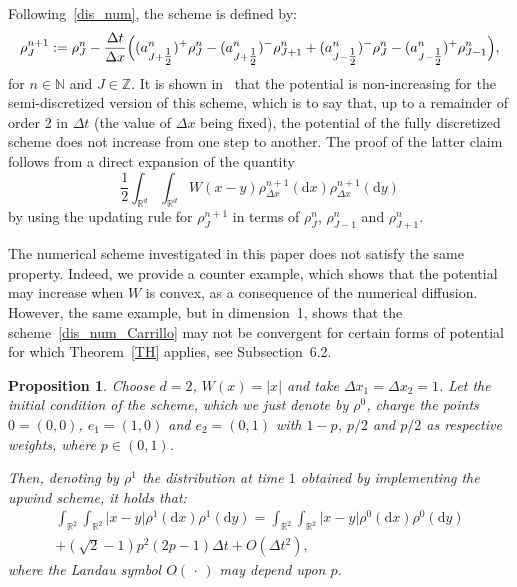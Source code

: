 \documentclass[11pt]{article}
\newtheorem{prop}[theo]{Proposition}
\theoremstyle{definition}
\numberwithin{equation}{section}
\newcommand*{\dd}{\mathrm{d}}
\newcommand*{\dx}{\dd x}
\newcommand*{\dy}{\dd y}
\newcommand*\NN{\mathbb{N}}
\newcommand*\RR{\mathbb{R}}
\newcommand*\ZZ{\mathbb{Z}}
\begin{document}
Following~\eqref{dis_num}, the scheme is defined by:
\begin{equation}\label{dis_num_Carrillo}
\rho^{n+1}_{J} := \rho^n_{J} - \frac{\Delta t}{\Delta x}
\Bigl((a^n_{J+\tfrac12} )^{+} \rho_{J}^n -
(a^n_{J+\tfrac12} )^{-} \rho_{J+1}^n +
(a^n_{J-\tfrac12} )^{-} \rho_{J}^n -
(a^n_{J-\tfrac12} )^{+} \rho_{J-1}^n
\Bigr),
\end{equation}
for $n \in \NN$ and $J \in \ZZ$. It is shown in~\cite{CCH} that the potential is non-increasing for the semi-discretized version of this scheme, which is to say that, up to a remainder of order 2 in $\Delta t$ (the value of $\Delta x$ being fixed), the potential of the fully discretized scheme does not increase from one step to another. The proof of the latter claim follows from a direct expansion of the quantity
\begin{equation*}
\frac12
\int_{\RR^d}
\int_{\RR^d} W(x-y)
\rho_{\Delta x}^{n+1}(\dx)
\rho_{\Delta x}^{n+1}(\dy)
\end{equation*}
by using the updating rule for $\rho^{n+1}_{J}$ in terms of $\rho^{n}_{J}$, $\rho^{n}_{J-1}$ and $\rho^{n}_{J+1}$.

The numerical scheme investigated in this paper does not satisfy the same property. Indeed, we provide a counter example, which shows that the potential may increase when $W$ is convex, as a consequence of the numerical diffusion. However, the same example, but in dimension~1, shows that the scheme~\eqref{dis_num_Carrillo} may not be convergent for certain forms of potential for which Theorem~\ref{TH} applies, see Subsection~6.2.

\begin{prop}
Choose $d=2$, $W(x)= | x |$ and take $\Delta x_{1} = \Delta x_{2} = 1$. Let the initial condition of the scheme, which we just denote by $\rho^0$, charge the points $0=(0,0)$, $e_{1}=(1,0)$ and $e_{2}=(0,1)$ with $1-p$, $p/2$ and $p/2$ as respective weights, where $p \in (0,1)$.

Then, denoting by $\rho^1$ the distribution at time $1$ obtained by implementing the upwind scheme, it holds that:
\begin{multline}\label{eq:counterexample}
\int_{\RR^2}\int_{\RR^2} \vert x- y \vert\rho^1(\dx)\rho^1(\dy) =  \int_{\RR^2}\int_{\RR^2} \vert x- y \vert\rho^0(\dx)\rho^0(\dy) \\
+ (\sqrt{2} -1 ) p^2 (2p-1) \Delta t + O(\Delta t^2),
\end{multline}
where the Landau symbol $O({\,\cdot\,})$ may depend upon $p$.
\end{prop}
\end{document}
